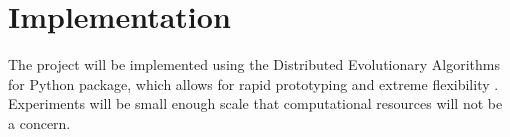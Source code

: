 \section{Implementation}

The project will be implemented using the Distributed Evolutionary Algorithms for Python package, which allows for rapid prototyping and extreme flexibility \cite{fortin2012deap}.
Experiments will be small enough scale that computational resources will not be a concern.
